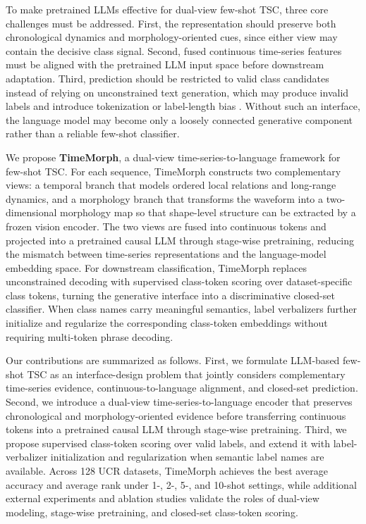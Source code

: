 \documentclass{article}
\begin{document}
To make pretrained LLMs effective for dual-view few-shot TSC, three core challenges must be addressed. First, the representation should preserve both chronological dynamics and morphology-oriented cues, since either view may contain the decisive class signal. Second, fused continuous time-series features must be aligned with the pretrained LLM input space before downstream adaptation. Third, prediction should be restricted to valid class candidates instead of relying on unconstrained text generation, which may produce invalid labels and introduce tokenization or label-length bias \citep{raffel2020exploring,hokamp2017lexically,koo2024automata}. Without such an interface, the language model may become only a loosely connected generative component rather than a reliable few-shot classifier.

We propose \textbf{TimeMorph}, a dual-view time-series-to-language framework for few-shot TSC. For each sequence, TimeMorph constructs two complementary views: a temporal branch that models ordered local relations and long-range dynamics, and a morphology branch that transforms the waveform into a two-dimensional morphology map so that shape-level structure can be extracted by a frozen vision encoder. The two views are fused into continuous tokens and projected into a pretrained causal LLM through stage-wise pretraining, reducing the mismatch between time-series representations and the language-model embedding space. For downstream classification, TimeMorph replaces unconstrained decoding with supervised class-token scoring over dataset-specific class tokens, turning the generative interface into a discriminative closed-set classifier. When class names carry meaningful semantics, label verbalizers further initialize and regularize the corresponding class-token embeddings without requiring multi-token phrase decoding.

Our contributions are summarized as follows. First, we formulate LLM-based few-shot TSC as an interface-design problem that jointly considers complementary time-series evidence, continuous-to-language alignment, and closed-set prediction. Second, we introduce a dual-view time-series-to-language encoder that preserves chronological and morphology-oriented evidence before transferring continuous tokens into a pretrained causal LLM through stage-wise pretraining. Third, we propose supervised class-token scoring over valid labels, and extend it with label-verbalizer initialization and regularization when semantic label names are available. Across 128 UCR datasets, TimeMorph achieves the best average accuracy and average rank under 1-, 2-, 5-, and 10-shot settings, while additional external experiments and ablation studies validate the roles of dual-view modeling, stage-wise pretraining, and closed-set class-token scoring.
\end{document}
